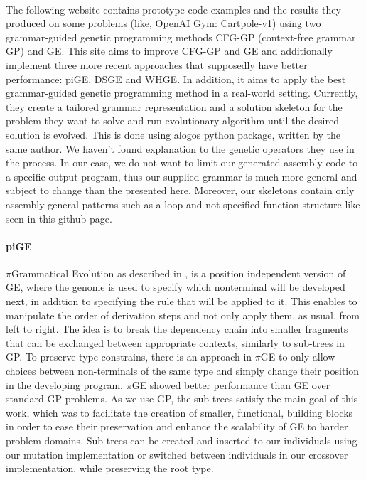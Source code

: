 \documentclass[dvipsnames,format=sigconf,anonymous=true,review=true]{acmart}
\begin{document}
\paragraph{}
The following website \cite{Haas2022GGGP} contains prototype code examples and the results they produced on some problems (like, OpenAI Gym: Cartpole-v1) using two grammar-guided genetic programming methods CFG-GP (context-free grammar GP) and GE. This site aims to improve CFG-GP and GE and additionally implement three more recent approaches that supposedly have better performance: piGE, DSGE and WHGE. In addition, it aims to apply the best grammar-guided genetic programming method in a real-world setting.
Currently, they create a tailored grammar representation and a solution skeleton for the problem they want to solve and run evolutionary algorithm until the desired solution is evolved. This is done using alogos python package, written by the same author. We haven't found explanation to the genetic operators they use in the process.
In our case, we do not want to limit our generated assembly code to a specific output program, thus our supplied grammar is much more general and subject to change than the presented here. Moreover, our skeletons contain only assembly general patterns such as a loop and not specified function structure like seen in this github page.

\paragraph{piGE}
\label{piGE}
$\pi$Grammatical Evolution as described in \cite{ONeil2004piGE}, is a position independent version of GE, where the genome is used to specify which nonterminal will be developed next, in addition to specifying the rule that will be applied to it. This enables to manipulate the order of derivation steps and not only apply them, as usual, from left to right. The idea is to break the dependency chain into smaller fragments that can be exchanged between appropriate contexts, similarly to sub-trees in GP. To preserve type constrains, there is an approach in $\pi$GE to only allow choices between non-terminals of the same type and simply change their position in the developing program. $\pi$GE showed better performance than GE over standard GP problems.
As we use GP, the sub-trees satisfy the main goal of this work, which was to facilitate the creation of smaller, functional, building blocks in order to ease their preservation and enhance the scalability of GE to harder problem domains. Sub-trees can be created and inserted to our individuals using our mutation implementation or switched between individuals in our crossover implementation, while preserving the root type.
\end{document}
